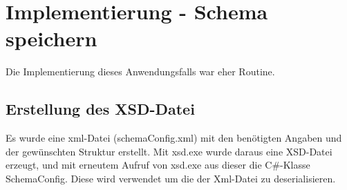 \section{Implementierung - Schema speichern}
\label{sec:ImplementierungSchemaSpeicherun}
Die Implementierung dieses Anwendungsfalls war eher Routine.
\subsection{Erstellung des XSD-Datei}
\label{sec:XSDDATEIERstellung}
Es wurde eine xml-Datei (schemaConfig.xml) mit den benötigten Angaben und der gewünschten Struktur erstellt. Mit xsd.exe wurde daraus eine XSD-Datei erzeugt, und mit erneutem Aufruf von xsd.exe aus dieser die C\#-Klasse SchemaConfig.
Diese wird verwendet um die der Xml-Datei zu deserialisieren.


